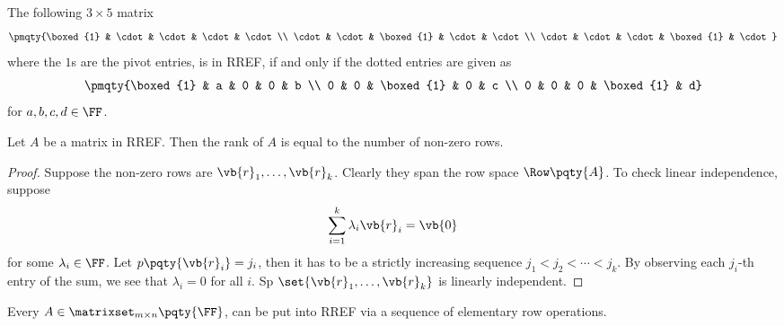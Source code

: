 \begin{example}
    The following \(3 \times 5\) matrix
    \[
        \pmqty{\boxed{1} & \cdot & \cdot & \cdot & \cdot \\ \cdot & \cdot & 
        \boxed{1} & \cdot & \cdot \\ \cdot & \cdot & \cdot & \boxed{1} & \cdot}
    \]
    where the \(1\)s are the pivot entries, is in RREF, if and only if the dotted entries are given as
    \[
        \pmqty{\boxed{1} & a & 0 & 0 & b \\ 0 & 0 & 
        \boxed{1} & 0 & c \\ 0 & 0 & 0 & \boxed{1} & d}
    \]
    for \(a, b, c, d \in \FF\).
\end{example}

\begin{lemma}
    Let \(A\) be a matrix in RREF. Then the rank of \(A\) is equal to the number of non-zero rows.
\end{lemma}

\begin{proof}
    Suppose the non-zero rows are \(\vb{r}_1, \ldots, \vb{r}_k\). Clearly they span the row space \(\Row\pqty{A}\). To check linear independence, suppose
    \[
        \sum_{i = 1}^{k} \lambda_i \vb{r}_i = \vb{0}
    \]
    for some \(\lambda_i \in \FF\). Let \(p\pqty{\vb{r}_i} = j_i\), then it has to be a strictly increasing sequence \(j_1 < j_2 < \cdots < j_k\). By observing each \(j_i\)-th entry of the sum, we see that \(\lambda_i = 0\) for all \(i\). Sp \(\set{\vb{r}_1, \ldots, \vb{r}_k}\) is linearly independent.
\end{proof}

\begin{proposition}
    \label{prop:matrix-can-be-put-into-rref}%
    Every \(A \in \matrixset_{m \times n} \pqty{\FF}\), can be put into RREF via a sequence of elementary row operations.
\end{proposition}

